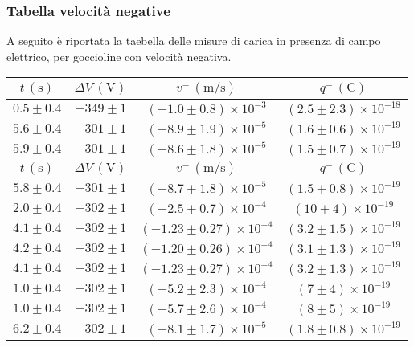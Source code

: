 \subsubsection{Tabella velocità negative}
A seguito è riportata la taebella delle misure di carica in presenza di campo elettrico, per goccioline con velocità negativa.        \renewcommand{\arraystretch}{1.3} %
        \begin{longtable}[C]{|c|c|c|c|}
            \hline
            $t \, (\mathrm{s})$ & $\Delta V \, (\mathrm{V})$ & $v^- \, (\mathrm{m/s})$ & $q^- \, (\mathrm{C})$ \\
            \hline
            $0.5 \pm 0.4$ & $-349 \pm 1$ & $(-1.0 \pm 0.8) \times 10^{-3}$ & $(2.5 \pm 2.3) \times 10^{-18}$ \\
            \hline
            $5.6 \pm 0.4$ & $-301 \pm 1$ & $(-8.9 \pm 1.9) \times 10^{-5}$ & $(1.6 \pm 0.6) \times 10^{-19}$ \\
            \hline
            $5.9 \pm 0.4$ & $-301 \pm 1$ & $(-8.6 \pm 1.8) \times 10^{-5}$ & $(1.5 \pm 0.7) \times 10^{-19}$ \\
            \hline
            $t \, (\mathrm{s})$ & $\Delta V \, (\mathrm{V})$ & $v^- \, (\mathrm{m/s})$ & $q^- \, (\mathrm{C})$ \\
            \hline
            $5.8 \pm 0.4$ & $-301 \pm 1$ & $(-8.7 \pm 1.8) \times 10^{-5}$ & $(1.5 \pm 0.8) \times 10^{-19}$ \\
            \hline
            $2.0 \pm 0.4$ & $-302 \pm 1$ & $(-2.5 \pm 0.7) \times 10^{-4}$ & $(10 \pm 4) \times 10^{-19}$ \\
            \hline
            $4.1 \pm 0.4$ & $-302 \pm 1$ & $(-1.23 \pm 0.27) \times 10^{-4}$ & $(3.2 \pm 1.5) \times 10^{-19}$ \\
            \hline
            $4.2 \pm 0.4$ & $-302 \pm 1$ & $(-1.20 \pm 0.26) \times 10^{-4}$ & $(3.1 \pm 1.3) \times 10^{-19}$ \\
            \hline
            $4.1 \pm 0.4$ & $-302 \pm 1$ & $(-1.23 \pm 0.27) \times 10^{-4}$ & $(3.2 \pm 1.3) \times 10^{-19}$ \\
            \hline
            $1.0 \pm 0.4$ & $-302 \pm 1$ & $(-5.2 \pm 2.3) \times 10^{-4}$ & $(7 \pm 4) \times 10^{-19}$ \\
            \hline
            $1.0 \pm 0.4$ & $-302 \pm 1$ & $(-5.7 \pm 2.6) \times 10^{-4}$ & $(8 \pm 5) \times 10^{-19}$ \\
            \hline
            $6.2 \pm 0.4$ & $-302 \pm 1$ & $(-8.1 \pm 1.7) \times 10^{-5}$ & $(1.8 \pm 0.8) \times 10^{-19}$ \\

\end{longtable}
